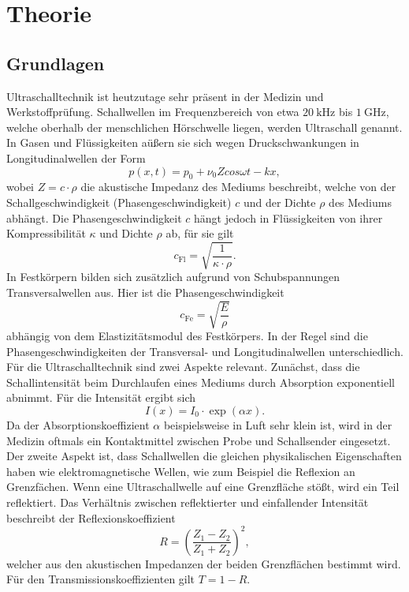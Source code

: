 \section{Theorie}
\label{sec:Theorie}


\subsection{Grundlagen}
Ultraschalltechnik ist heutzutage sehr präsent in der Medizin und Werkstoffprüfung.
Schallwellen im Frequenzbereich von etwa $\SI{20}{\kilo\hertz}$ bis $\SI{1}{\giga\hertz}$, welche oberhalb der menschlichen Hörschwelle liegen, werden Ultraschall genannt.
In Gasen und Flüssigkeiten aüßern sie sich wegen Druckschwankungen in Longitudinalwellen der Form
\begin{equation}
  p(x,t) = p_0 + \nu_0 Z cos{\omega t -kx},
\end{equation}
wobei $Z = c \cdot \rho$ die akustische Impedanz des Mediums beschreibt, welche von der Schallgeschwindigkeit (Phasengeschwindigkeit) $c$ und der Dichte $\rho$ des Mediums abhängt.
Die Phasengeschwindigkeit $c$ hängt jedoch in Flüssigkeiten von ihrer Kompressibilität $\kappa$ und Dichte $\rho$ ab, für sie gilt
\begin{equation}
  c_{\text{Fl}} = \sqrt{\frac{1}{\kappa \cdot \rho}}.
\end{equation}
In Festkörpern bilden sich zusätzlich aufgrund von Schubspannungen Transversalwellen aus.
Hier ist die Phasengeschwindigkeit
\begin{equation}
  c_{\text{Fe}} = \sqrt{\frac{E}{\rho}}
\end{equation}
abhängig von dem Elastizitätsmodul des Festkörpers.
In der Regel sind die Phasengeschwindigkeiten der Transversal- und Longitudinalwellen unterschiedlich.\\
Für die Ultraschalltechnik sind zwei Aspekte relevant.
Zunächst, dass die Schallintensität beim Durchlaufen eines Mediums durch Absorption exponentiell abnimmt.
Für die Intensität ergibt sich
\begin{equation}
  I(x) = I_0 \cdot \exp(\alpha x). \label{gl:1}
\end{equation}
Da der Absorptionskoeffizient $\alpha$ beispielsweise in Luft sehr klein ist, wird in der Medizin oftmals ein Kontaktmittel zwischen Probe und Schallsender eingesetzt.\\
Der zweite Aspekt ist, dass Schallwellen die gleichen physikalischen Eigenschaften haben wie elektromagnetische Wellen, wie zum Beispiel die Reflexion an Grenzfächen.
Wenn eine Ultraschallwelle auf eine Grenzfläche stößt, wird ein Teil reflektiert.
Das Verhältnis zwischen reflektierter und einfallender Intensität beschreibt der Reflexionskoeffizient
\begin{equation}
  R = \left(\frac{Z_1-Z_2}{Z_1+Z_2}\right)^2,
\end{equation}
welcher aus den akustischen Impedanzen der beiden Grenzflächen bestimmt wird.
Für den Transmissionskoeffizienten gilt $T = 1 - R$.

